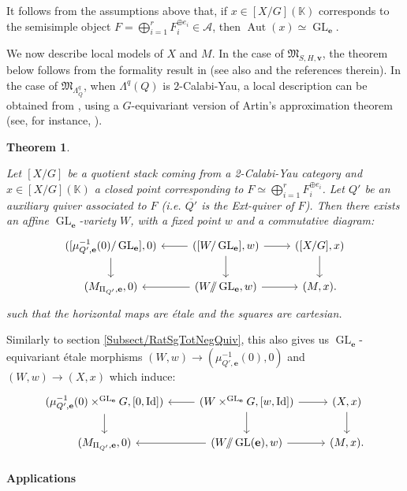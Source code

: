 \documentclass[11pt,english]{article}
\numberwithin{equation}{section}
\numberwithin{figure}{section}
\theoremstyle{definition}
\theoremstyle{plain}
\newtheorem{thm}[df]{Theorem}
\theoremstyle{remark}
\DeclareMathOperator{\Aut}{Aut}
\DeclareMathOperator{\Id}{Id}
\DeclareMathOperator{\GL}{GL}
\newcommand\ee{\mathbf{e}}
\newcommand\KK{\mathbb{K}}
\newcommand\git{/\!\!/}
\begin{document}
It follows from the assumptions above that, if $x\in[X/G](\KK)$ corresponds
to the semisimple object $F=\bigoplus_{i=1}^{r}F_{i}^{\oplus e_{i}}\in\mathcal{A}$,
then $\Aut(x)\simeq\GL_{\ee}$.

We now describe local models of $X$ and $M$. In the case of $\mathfrak{M}_{S,H,\textbf{v}}$,
the theorem below follows from the formality result in \cite{BZ19}
(see also \cite[\S3-4.]{AS18} and the references therein). In the
case of $\mathfrak{M}_{\Lambda_{Q}^{q}}$, when $\Lambda^{q}(Q)$
is $2$-Calabi-Yau, a local description can be obtained from \cite[Thm. 5.12 - Thm. 5.16.]{KS23a},
using a $G$-equivariant version of Artin's approximation theorem
(see, for instance, \cite{AHR20}).

\begin{thm}{\cite[Thm. 5.11.]{Dav21a}} \label{Thm/LocMod2CY}

Let $[X/G]$ be a quotient stack coming from a 2-Calabi-Yau category
and $x\in[X/G](\KK)$ a closed point corresponding to $F\simeq\bigoplus_{i=1}^{r}F_{i}^{\oplus e_{i}}$.
Let $Q'$ be an auxiliary quiver associated to $F$ (i.e. $\overline{Q'}$
is the Ext-quiver of $F$). Then there exists an affine $\GL_{\ee}$-variety
$W$, with a fixed point $w$ and a commutative diagram:\[
\begin{tikzcd}[ampersand replacement = \&]
([\mu_{Q',\ee}^{-1}(0)/\GL_{\ee}],0) \ar[d] \& ([W/\GL_{\ee}],w) \ar[l]\ar[r]\ar[d] \& ([X/G],x) \ar[d] \\
(M_{\Pi_{Q'},\ee},0) \& (W\git\GL_{\ee},w) \ar[l]\ar[r] \& (M,x).
\end{tikzcd}
\]such that the horizontal maps are étale and the squares are cartesian.

\end{thm}

Similarly to section \ref{Subsect/RatSgTotNegQuiv}, this also gives
us $\GL_{\ee}$-equivariant étale morphisms $(W,w)\rightarrow(\mu_{Q',\ee}^{-1}(0),0)$
and $(W,w)\rightarrow(X,x)$ which induce:\[
\begin{tikzcd}[ampersand replacement = \&]
(\mu_{Q',\ee}^{-1}(0)\times^{\GL_{\ee}}G,[0,\Id]) \ar[d] \& (W\times^{\GL_{\ee}}G,[w,\Id]) \ar[l]\ar[r]\ar[d] \& (X,x) \ar[d] \\
(M_{\Pi_{Q'},\ee},0) \& (W\git\GL(\ee),w) \ar[l]\ar[r] \& (M,x).
\end{tikzcd}
\]

\paragraph*{Applications}
\end{document}
